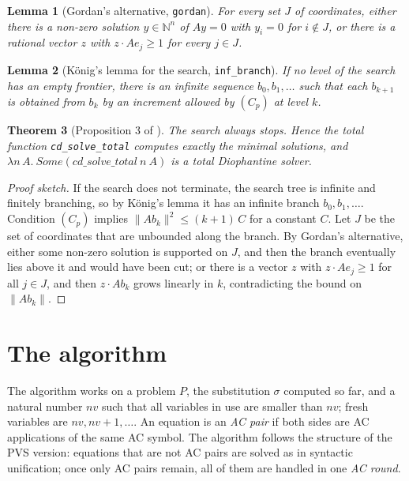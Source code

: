 \documentclass[11pt,a4paper]{article}
\newtheorem{theorem}{Theorem}[section]
\newtheorem{lemma}[theorem]{Lemma}
\theoremstyle{definition}
\theoremstyle{remark}
\newcommand{\isa}[1]{\mbox{\small\texttt{#1}}}
\newcommand{\N}{\mathbb{N}}
\begin{document}
\begin{lemma}[Gordan's alternative, \isa{gordan}]
  For every set $J$ of coordinates, either there is a non-zero solution $y \in \N^n$ of $Ay = 0$
  with $y_i = 0$ for $i \notin J$, or there is a rational vector $z$ with $z \cdot Ae_j \ge 1$ for
  every $j \in J$.
\end{lemma}

\begin{lemma}[König's lemma for the search, \isa{inf\_branch}]
  If no level of the search has an empty frontier, there is an infinite sequence
  $b_0, b_1, \dots$ such that each $b_{k+1}$ is obtained from $b_k$ by an increment allowed by
  $(C_p)$ at level $k$.
\end{lemma}

\begin{theorem}[Proposition 3 of \cite{BCD90}]
  The search always stops. Hence the total function \isa{cd\_solve\_total} computes exactly the
  minimal solutions, and $\lambda n\,A.\ \mathit{Some}(\mathit{cd\_solve\_total}\ n\ A)$ is a
  total Diophantine solver.
\end{theorem}

\begin{proof}[Proof sketch]
  If the search does not terminate, the search tree is infinite and finitely branching, so by
  König's lemma it has an infinite branch $b_0, b_1, \dots$. Condition $(C_p)$ implies
  $\lVert A b_k\rVert^2 \le (k+1)\,C$ for a constant $C$. Let $J$ be the set of coordinates that
  are unbounded along the branch. By Gordan's alternative, either some non-zero solution is
  supported on $J$, and then the branch eventually lies above it and would have been cut; or
  there is a vector $z$ with $z \cdot Ae_j \ge 1$ for all $j \in J$, and then $z \cdot Ab_k$ grows
  linearly in $k$, contradicting the bound on $\lVert Ab_k\rVert$.
\end{proof}

\section{The algorithm}\label{sec:alg}

The algorithm works on a problem $P$, the substitution $\sigma$ computed so far, and a natural
number $\mathit{nv}$ such that all variables in use are smaller than $\mathit{nv}$; fresh
variables are $\mathit{nv}, \mathit{nv}+1, \dots$. An equation is an \emph{AC pair} if both sides
are AC applications of the same AC symbol. The algorithm follows the structure of the PVS
version: equations that are not AC pairs are solved as in syntactic unification; once only AC
pairs remain, all of them are handled in one \emph{AC round}.
\end{document}
